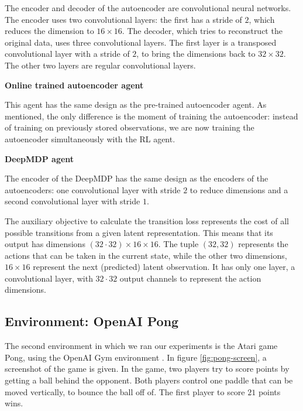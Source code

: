 The encoder and decoder of the autoencoder are convolutional neural networks. The encoder uses two convolutional layers: the first has a stride of $2$, which reduces the dimension to $16 \times 16$. The decoder, which tries to reconstruct the original data, uses three convolutional layers. The first layer is a transposed convolutional layer with a stride of $2$, to bring the dimensions back to $32 \times 32$. The other two layers are regular convolutional layers. \newline\par
 
\noindent \textbf{Online trained autoencoder agent} \par
\noindent  This agent has the same design as the pre-trained autoencoder agent. As mentioned, the only difference is the moment of training the autoencoder: instead of training on previously stored observations, we are now training the autoencoder simultaneously with the RL agent. \newline\par

\noindent \textbf{DeepMDP agent}\par
\noindent The encoder of the DeepMDP has the same design as the encoders of the autoencoders: one convolutional layer with stride $2$ to reduce dimensions and a second convolutional layer with stride $1$. 

The auxiliary objective to calculate the transition loss represents the cost of all possible transitions from a given latent representation. This means that its output has dimensions $(32 \cdot 32) \times 16 \times 16$. The tuple $(32, 32)$ represents the actions that can be taken in the current state, while the other two dimensions, $16 \times 16$ represent the next (predicted) latent observation. It has only one layer, a convolutional layer, with $32 \cdot 32$ output channels to represent the action dimensions.

\subsection{Environment: OpenAI Pong}\label{research-env-pong}
The second environment in which we ran our experiments is the Atari game Pong, using the OpenAI Gym environment \cite{pong}. In figure \ref{fig:pong-screen}, a screenshot of the game is given. In the game, two players try to score points by getting a ball behind the opponent. Both players control one paddle that can be moved vertically, to bounce the ball off of. The first player to score $21$ points wins.

